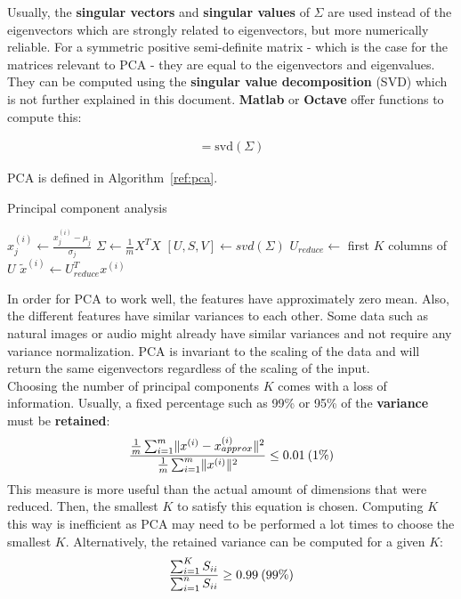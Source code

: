 \documentclass{report}
\begin{document}
Usually, the {\bf singular vectors} and {\bf singular values} of $\Sigma$ are used instead of the eigenvectors which are strongly related to eigenvectors, but more numerically reliable.
For a symmetric positive semi-definite matrix - which is the case for the matrices relevant to PCA - they are equal to the eigenvectors and eigenvalues.
They can be computed using the {\bf singular value decomposition} (SVD) which is not further explained in this document.
{\bf Matlab} or {\bf Octave} offer functions to compute this:

\begin{align*}
[U,S,V] = \mbox{svd}(\Sigma)
\end{align*}

PCA is defined in Algorithm~\ref{ref:pca}.

\begin{algorithm}
\caption{Principal component analysis}
\label{ref:pca}
\begin{algorithmic}
\State $x_j^{(i)} \gets \frac{x_j^{(i)} - \mu_j}{\sigma_j} $ 
\State $\Sigma \gets \frac{1}{m}X^TX$ 
\State $[U,S,V] \gets svd(\Sigma)$ 
\State $U_{reduce} \gets$ first $K$ columns of $U$ 
\State $\tilde{x}^{(i)} \gets U_{reduce}^Tx^{(i)}$ 
\end{algorithmic}
\end{algorithm}

In order for PCA to work well, the features have approximately zero mean.
Also, the different features have similar variances to each other.
Some data such as natural images or audio might already have similar variances and not require any variance normalization.
PCA is invariant to the scaling of the data and will return the same eigenvectors regardless of the scaling of the input.
\\

Choosing the number of principal components $K$ comes with a loss of information. Usually, a fixed percentage such as 99\% or 95\% of the {\bf variance} must be {\bf retained}:
\begin{align*}
\frac{\frac{1}{m}\sum_{i=1}^m \lVert x^{(i)}-x_{approx}^{(i)} \Vert^2}{\frac{1}{m}\sum_{i=1}^m \lVert x^{(i)} \Vert^2} \le 0.01\:\mbox(1\%)
\end{align*}
This measure is more useful than the actual amount of dimensions that were reduced. Then, the smallest $K$ to satisfy this equation is chosen. Computing $K$ this way is inefficient as PCA may need to be performed a lot times to choose the smallest $K$. Alternatively, the retained variance can be computed for a given $K$:
\begin{align*}
\frac{\sum_{i=1}^{K}S_{ii}}{\sum_{i=1}^{n}S_{ii}} \ge 0.99\:\mbox(99\%)
\end{align*}
\end{document}
